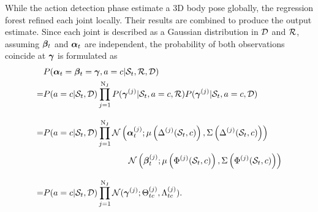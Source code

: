 While the action detection phase estimate a 3D body pose globally, the regression forest refined each joint locally. Their results are combined to produce the output estimate. Since each joint is described as a Gaussian distribution in $\mathcal{D}$ and $\mathcal{R}$, assuming $\boldsymbol{\beta}_{t}$ and $\boldsymbol{\alpha}_{t}$ are independent, the probability of both observations coincide at $\boldsymbol{\gamma}$ is formulated as
\begin{equation}
	\label{eqn/body/combine}
	\begin{aligned}
		& P( \bodyposead_{\timenow}=\bodyposepr_{\timenow}=\bodyposez, \action=c| \snippetnow, \forestr, \forestd)\\ 
		= & P(\action=c | \snippetnow, \forestd) \prod_{j = 1}^{\njoints} P( \bodyposez^{(j)} | \snippetnow, \action=c, \forestr) P( \bodyposez^{(j)}  | \snippetnow, \action=c, \forestd) \\[3mm]
		= &  P(\action = c | \snippetnow, \forestd) \prod_{j= 1} ^{\njoints}
		\normdist\left(\bodyposead^{(j)}_{\timenow}; \mu\left(\toffsetfunc^{(j)}(\snippetnow,c)\right), \Sigma\left(\toffsetfunc^{(j)}(\snippetnow,c)\right)\right) \\[1mm]
		& \hspace{35mm} \normdist\left(\bodyposepr_{\timenow}^{(j)};\mu\left(\Phi^{(j)}(\snippetnow, c)\right),\Sigma\left(\Phi^{(j)}(\snippetnow,c)\right)\right)\\[3mm]
		= &  P(\action=c | \snippetnow, \forestd) \prod_{j = 1}^{\njoints} \normdist(\bodyposez^{(j)}; \finalbodypose^{(j)}_{\timenow c}, \finalvariance^{(j)}_{\timenow c}).
	\end{aligned}
\end{equation} 
